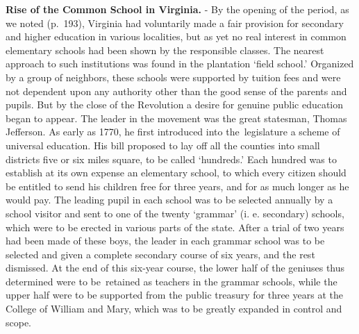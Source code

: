 \documentclass[
]{book}
\begin{document}
\textbf{Rise of the Common School in Virginia.} - By the opening of the period, as we noted (p.~193), Virginia had voluntarily made a fair provision for secondary and higher education in various localities, but as yet no real interest in common elementary schools had been shown by the responsible classes. The nearest approach to such institutions was found in the plantation `field school.' Organized by a group of neighbors, these schools were supported by tuition fees and were not dependent upon any authority other than the good sense of the parents and pupils. But by the close of the Revolution a desire for genuine public education began to appear. The leader in the movement was the great statesman, Thomas Jefferson. As early as 1770, he first introduced into the~legislature a scheme of universal education. His bill proposed to lay off all the counties into small districts five or six miles square, to be called `hundreds.' Each hundred was to establish at its own expense an elementary school, to which every citizen should be entitled to send his children free for three years, and for as much longer as he would pay. The leading pupil in each school was to be selected annually by a school visitor and sent to one of the twenty `grammar' (i. e. secondary) schools, which were to be erected in various parts of the state. After a trial of two years had been made of these boys, the leader in each grammar school was to be selected and given a complete secondary course of six years, and the rest dismissed. At the end of this six-year course, the lower half of the geniuses thus determined were to be~retained as teachers in the grammar schools, while the upper half were to be supported from the public treasury for three years at the College of William and Mary, which was to be greatly expanded in control and scope.
\end{document}

